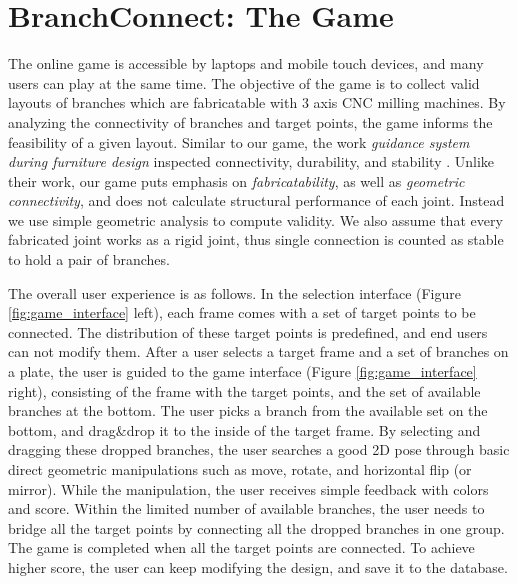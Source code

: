 \section{BranchConnect: The Game}
\label{sec:game}
The online game is accessible by laptops and mobile touch devices, and many users can play at the same time.
The objective of the game is to collect valid layouts of branches which are fabricatable with 3 axis CNC milling machines.
By analyzing the connectivity of branches and target points, the game informs the feasibility of a given layout.
Similar to our game, the work \textit{guidance system during furniture design} inspected connectivity, durability, and stability \cite{umetani2012guided}.
Unlike their work, our game puts emphasis on \textit{fabricatability}, as well as \textit{geometric connectivity}, and does not calculate structural performance of each joint.
Instead we use simple geometric analysis to compute validity.
We also assume that every fabricated joint works as a rigid joint, thus single connection is counted as stable to hold a pair of branches.

The overall user experience is as follows.
In the selection interface (Figure \ref{fig:game_interface} left), each frame comes with a set of target points to be connected.
The distribution of these target points is predefined, and end users can not modify them.
After a user selects a target frame and a set of branches on a plate, the user is guided to the game interface (Figure \ref{fig:game_interface} right), consisting of the frame with the target points, and the set of available branches at the bottom.
The user picks a branch from the available set on the bottom, and drag\&drop it to the inside of the target frame.
By selecting and dragging these dropped branches, the user searches a good 2D pose through basic direct geometric manipulations such as move, rotate, and horizontal flip (or mirror).
While the manipulation, the user receives simple feedback with colors and score.
Within the limited number of available branches, the user needs to bridge all the target points by connecting all the dropped branches in one group.
The game is completed when all the target points are connected.
To achieve higher score, the user can keep modifying the design, and save it to the database.


